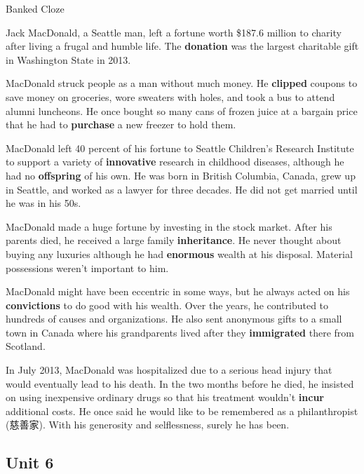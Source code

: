 \begin{question}{Banked Cloze}

Jack MacDonald, a Seattle man, left a fortune worth 
\$187.6 million to charity after living a frugal and humble life. The {\color{red}\textbf{donation}} was the largest charitable gift in Washington State in 2013.

MacDonald struck people as a man without much money. He {\color{red}\textbf{clipped}} coupons to save money on groceries, wore sweaters with holes, and took a bus to attend alumni luncheons. He once bought so many cans of frozen juice at a bargain price that he had to {\color{red}\textbf{purchase}} a new freezer to hold them.

MacDonald left 40 percent of his fortune to Seattle Children's Research Institute to support a variety of {\color{red}\textbf{innovative}} research in childhood diseases, although he had no {\color{red}\textbf{offspring}} of his own. He was born in British Columbia, Canada, grew up in Seattle, and worked as a lawyer for three decades. He did not get married until he was in his 50s.

MacDonald made a huge fortune by investing in the stock market. After his parents died, he received a large family {\color{red}\textbf{inheritance}}. He never thought about buying any luxuries although he had {\color{red}\textbf{enormous}} wealth at his disposal. Material possessions weren't important to him.

MacDonald might have been eccentric in some ways, but he always acted on his {\color{red}\textbf{convictions}} to do good with his wealth. Over the years, he contributed to hundreds of causes and organizations. He also sent anonymous gifts to a small town in Canada where his grandparents lived after they {\color{red}\textbf{immigrated}} there from Scotland.

In July 2013, MacDonald was hospitalized due to a serious head injury that would eventually lead to his death. In the two months before he died, he insisted on using inexpensive ordinary drugs so that his treatment wouldn't {\color{red}\textbf{incur}} additional costs. He once said he would like to be remembered as a philanthropist (慈善家). With his generosity and selflessness, surely he has been.
	
\end{question}

\newpage

\subsection{Unit 6}

